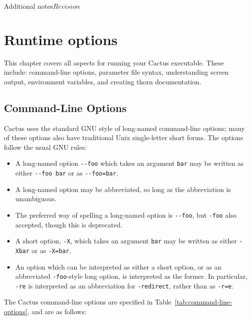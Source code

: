\begin{cactuspart}{Additional notes}{}{$Revision$}

\chapter{Runtime options}

This chapter covers all aspects for running your
Cactus executable.  These include: command-line options, parameter
file syntax, understanding screen output, environment variables, and
creating thorn documentation.

\section{Command-Line Options}
\label{sec:command_line_options}

Cactus uses the standard GNU style of long-named command-line options;
many of these options also have traditional Unix single-letter short forms.
The options follow the usual GNU rules:
\begin{itemize}
\item	A long-named option \verb|--foo| which takes an argument \verb|bar|
	may be written as either \verb|--foo bar| or as \verb|--foo=bar|.
\item	A long-named option may be abbreviated, so long as the abbreviation
	is unambiguous.
\item	The preferred way of spelling a long-named option is \verb|--foo|,
	but \verb|-foo| also accepted, though this is deprecated.
\item	A short option, \verb|-X|, which takes an argument \verb|bar|
	may be written as either \verb|-Xbar| or as \verb|-X=bar|.
\item	An option which can be interpreted as either a short option,
	or as an abbreviated \verb|-foo|-style long option, is interpreted
	as the former.  In particular, \verb|-re| is interpreted as
	an abbreviation for \verb|-redirect|, rather than as \verb|-r=e|.
\end{itemize}

The Cactus command-line options are specified in
Table~\ref{tab:command-line-options}, and are as follows:


\end{cactuspart}
